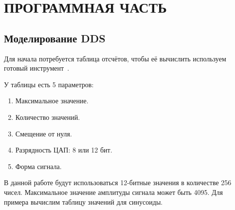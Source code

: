 \chapter{ПРОГРАММНАЯ ЧАСТЬ}
\section{Моделирование DDS}
Для начала потребуется таблица отсчётов, чтобы её вычислить используем готовый инструмент~\cite{lut}.
	
	
	У таблицы есть 5 параметров:
	\begin{enumerate}
		\item Максимальное значение.
		\item Количество значений.
		\item Смещение от нуля.
		\item Разрядность ЦАП: 8 или 12 бит.
		\item Форма сигнала.
	\end{enumerate}
	
	В данной работе будут использоваться 12-битные значения в количестве 256 чисел. Максимальное значение амплитуды сигнала может быть 4095. Для примера вычислим таблицу значений для синусоиды.
	
	
	
	
	
	
	
